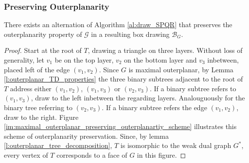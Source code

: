 \subsubsection{Preserving Outerplanarity}

\begin{theorem}
	There exists an alternation of Algorithm \ref{al:draw_SPQR} that preserves the outerplanarity property of $\mathcal{G}$ in a resulting box drawing $\mathcal{B}_{G}$.
\end{theorem}
\begin{proof}
Start at the root of $T$, drawing a triangle on three layers. Without loss of generality, let $v_1$ be on the top layer, $v_2$ on the bottom layer and $v_3$ inbetween, placed left of the edge $(v_1,v_2)$.
Since $G$ is maximal outerplanar, by Lemma \ref{l:outerplanar_TD_properties} the three binary subtrees adjacent to the root of $T$ address either $(v_1,v_2)$, $(v_1,v_3)$ or $(v_2,v_3)$. If a binary subtree refers to $(v_1,v_3)$, draw to the left inbetween the regarding layers. Analouguously for the binary tree referring to $(v_2,v_3)$. If a binary subtree refers the edge $(v_1,v_2)$, draw to the right. Figure \ref{im:maximal_outerplanar_preserving_outerplanartiy_scheme} illustrates this scheme of outerplanarity preservation. Since, by lemma \ref{l:outerplanar_tree_decomposition}, $T$ is isomorphic to the weak dual graph $G^*$, every vertex of $T$ corresponds to a face of $G$ in this figure.
	

\end{proof}
